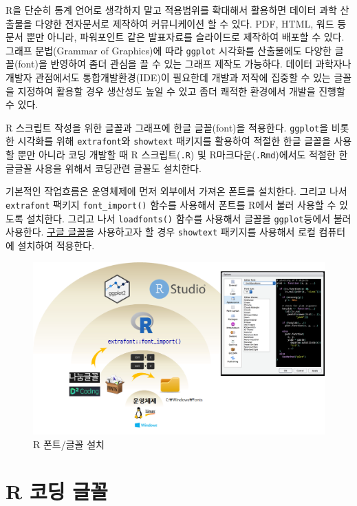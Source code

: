 \documentclass[
]{book}
\begin{document}
R을 단순히 통계 언어로 생각하지 말고 적용범위를 확대해서 활용하면
데이터 과학 산출물을 다양한 전자문서로 제작하여 커뮤니케이션 할 수 있다.
PDF, HTML, 워드 등 문서 뿐만 아니라, 파워포인트 같은 발표자료를
슬라이드로 제작하여 배포할 수 있다. 그래프 문법(Grammar of Graphics)에 따라
\texttt{ggplot} 시각화를 산출물에도 다양한 글꼴(font)을 반영하여 좀더 관심을 끌 수 있는
그래프 제작도 가능하다. 데이터 과학자나 개발자 관점에서도 통합개발환경(IDE)이
필요한데 개발과 저작에 집중할 수 있는 글꼴을 지정하여 활용할 경우
생산성도 높일 수 있고 좀더 쾌적한 환경에서 개발을 진행할 수 있다.

R 스크립트 작성을 위한 글꼴과 그래프에 한글 글꼴(font)을 적용한다.
\texttt{ggplot}을 비롯한 시각화를 위해 \texttt{extrafont}와 \texttt{showtext} 패키지를
활용하여 적절한 한글 글꼴을 사용할 뿐만 아니라 코딩 개발할 때
R 스크립트(\texttt{.R}) 및 R마크다운(\texttt{.Rmd})에서도 적절한 한글글꼴 사용을 위해서
코딩관련 글꼴도 설치한다.

기본적인 작업흐름은 운영체제에 먼저 외부에서 가져온 폰트를 설치한다.
그리고 나서 \texttt{extrafont} 팩키지 \texttt{font\_import()} 함수를 사용해서 폰트를
R에서 불러 사용할 수 있도록 설치한다. 그리고 나서 \texttt{loadfonts()} 함수를
사용해서 글꼴을 \texttt{ggplot}등에서 불러 사용한다.
\href{https://fonts.google.com/}{구글 글꼴}을 사용하고자 할 경우 \texttt{showtext} 패키지를
사용해서 로컬 컴퓨터에 설치하여 적용한다.

\begin{figure}
\centering
\includegraphics[width=1\textwidth,height=\textheight]{assets/images/font_overview.png}
\caption{R 폰트/글꼴 설치}
\end{figure}

\hypertarget{font-coding}{%
\section{R 코딩 글꼴}\label{font-coding}}
\end{document}
